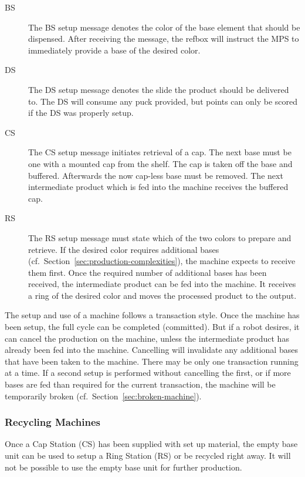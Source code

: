 \documentclass[12pt,twoside]{article}
\newcommand{\refsec}[1]{Section~\ref{#1}}
\begin{document}
\begin{description}
\item[BS] The BS setup message denotes the color of the base element
  that should be dispensed. After receiving the message, the refbox
  will instruct the MPS to immediately provide a base of the desired
  color.
\item[DS] The DS setup message denotes the slide the product should be
  delivered to. The DS will consume any puck provided, but points can
  only be scored if the DS was properly setup.
\item[CS] The CS setup message initiates retrieval of a cap. The next
  base must be one with a mounted cap from the shelf. The cap is taken
  off the base and buffered. Afterwards the now cap-less base must be
  removed. The next intermediate product which is fed into the machine
  receives the buffered cap.
\item[RS] The RS setup message must state which of the two colors to
  prepare and retrieve. If the desired color requires additional bases
  (cf.~\refsec{sec:production-complexities}), the machine expects to
  receive them first. Once the required number of additional bases has
  been received, the intermediate product can be fed into the
  machine. It receives a ring of the desired color and moves the
  processed product to the output.
\end{description}

\noindent
The setup and use of a machine follows a transaction style. Once the
machine has been setup, the full cycle can be completed (committed).
But if a robot desires, it can cancel the production on the machine,
unless the intermediate product has already been fed into the
machine. Cancelling will invalidate any additional bases that have
been taken to the machine. There may be only one transaction running
at a time. If a second setup is performed without cancelling the
first, or if more bases are fed than required for the current
transaction, the machine will be temporarily broken
(cf.~\refsec{sec:broken-machine}).

\subsubsection{Recycling Machines}
Once a Cap Station (CS) has been supplied with set up material, the
empty base unit can be used to setup a Ring Station (RS) or be
recycled right away. It will not be possible to use the empty base
unit for further production.
\end{document}
